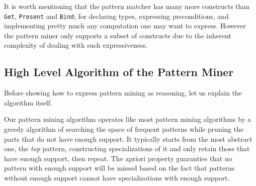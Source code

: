 \documentclass[runningheads]{llncs}
\begin{document}
It is worth mentioning that the pattern matcher has many more
constructs than \texttt{Get}, \texttt{Present} and \texttt{Bind}; for
declaring types, expressing preconditions, and implementing pretty
much any computation one may want to express. However the pattern
miner only supports a subset of constructs due to the inherent
complexity of dealing with such expressiveness.

\subsection{High Level Algorithm of the Pattern Miner}

Before showing how to express pattern mining as reasoning, let us
explain the algorithm itself.

Our pattern mining algorithm operates like most pattern mining
algorithms \cite{Chi2005Freq} by a greedy algorithm of
searching the space of frequent
patterns while pruning the parts that do not have enough support. It
typically starts from the most abstract one, the \emph{top} pattern,
constructing specializations of it and only retain those that have
enough support, then repeat. The apriori property
\cite{Agrawal1994fastalgorithms} guaranties that no pattern with
enough support will be missed based on the fact that patterns without
enough support cannot have specializations with enough support.
\end{document}
